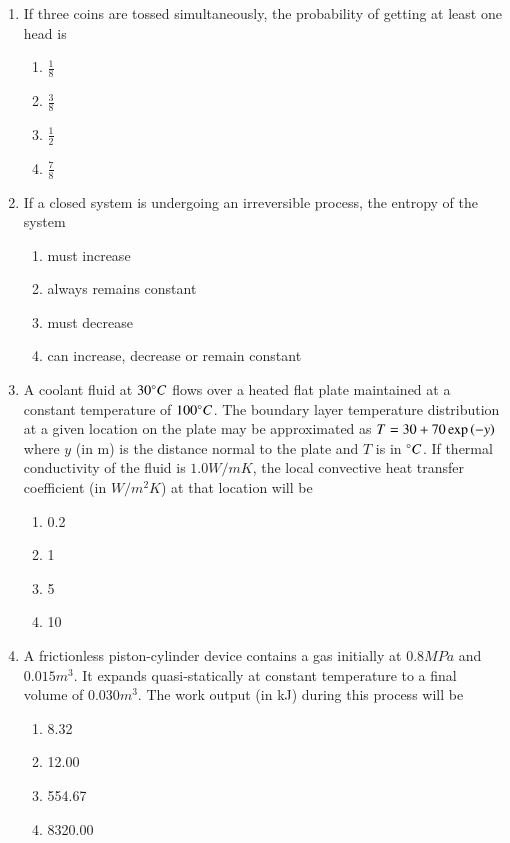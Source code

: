 \documentclass[journal]{IEEEtran}
\begin{document}
\begin{enumerate}
    \item If three coins are tossed simultaneously, the probability of getting at
    least one head is
    \begin{multicols}{4}
    \begin{enumerate}
        \item $\frac{1}{8}$
        \item $\frac{3}{8}$
        \item $\frac{1}{2}$
        \item $\frac{7}{8}$
    \end{enumerate}
    \end{multicols}

    \item If a closed system is undergoing an irreversible process, the entropy
    of the system
    \begin{enumerate}
        \item must increase
        \item always remains constant
        \item must decrease
        \item can increase, decrease or remain constant
    \end{enumerate}

    \item A coolant fluid at $30 \degree C$ flows over a heated flat plate
    maintained at a constant temperature of $100 \degree C$. The boundary
    layer temperature distribution at a given location on the plate may be
    approximated as $T = 30 + 70\exp\left(-y\right)$ where $y$ (in m) is the
    distance normal to the plate and $T$ is in $\degree C$. If thermal
    conductivity of the fluid is $1.0 W/mK$, the local convective heat
    transfer coefficient (in $W/m^2K$) at that location will be
    \begin{multicols}{4}
    \begin{enumerate}
        \item 0.2
        \item 1
        \item 5
        \item 10
    \end{enumerate}
    \end{multicols}

    \item A frictionless piston-cylinder device contains a gas initially at
    $0.8 MPa$ and $0.015 m^3$. It expands quasi-statically at constant
    temperature to a final volume of $0.030 m^3$. The work output (in kJ)
    during this process will be
    \begin{multicols}{4}
    \begin{enumerate}
        \item 8.32
        \item 12.00
        \item 554.67
        \item 8320.00
    \end{enumerate}
    \end{multicols}


\end{enumerate}
\end{document}
